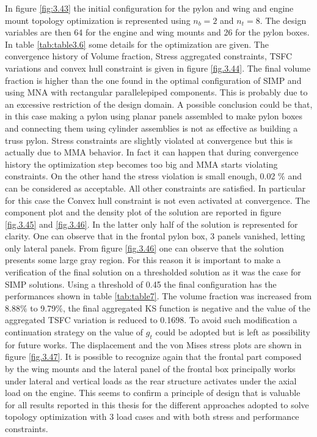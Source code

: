     In figure \ref{fig:3.43} the initial configuration for the pylon and wing and engine mount topology optimization is represented using $n_b=2$ and $n_t=8$. The design variables are then 64 for the engine and wing mounts and 26 for the pylon boxes. In table \ref{tab:table3.6} some details for the optimization are  given. The convergence history of Volume fraction, Stress aggregated constraints, TSFC variations and convex hull constraint is given in figure \ref{fig.3.44}. The final volume fraction is higher than the one found in the optimal configuration of SIMP and using MNA with rectangular parallelepiped components. This is probably due to an excessive restriction of the design domain. A possible conclusion could be that, in this case making a pylon using planar panels assembled to make pylon boxes and connecting them using cylinder assemblies is not as effective as building a truss pylon. Stress constraints are slightly violated at convergence but this is actually due to MMA behavior. In fact it can happen that during convergence history the optimization step becomes too big and MMA starts violating constraints. On the other hand the stress violation is small enough, 0.02 $\%$ and can be considered as acceptable. All other constraints are satisfied. In particular for this case the Convex hull constraint is not even activated at convergence. The component plot and the density plot of the solution are reported in figure \ref{fig.3.45} and \ref{fig.3.46}. In the latter only half of the solution is represented for clarity. One can observe that in the frontal pylon box, 3 panels vanished, letting only lateral panels. From figure \ref{fig.3.46} one can observe that the solution presents some large gray region. For this reason it is important to make a verification of the final solution on a thresholded solution as it was the case for SIMP solutions. Using a threshold of 0.45 the final configuration has the performances shown in table \ref{tab:table7}. The volume fraction was increased from 8.88$\%$ to 9.79$\%$, the final aggregated KS function is negative and the value of the aggregated TSFC variation is reduced to 0.1698. To avoid such modification a continuation strategy on the value of $g_t$ could be adopted but is left as possibility for future works. The displacement and the von Mises stress plots are shown in figure \ref{fig.3.47}. It is possible to recognize again that the frontal part composed by the wing mounts and the lateral panel of the frontal box principally works under lateral and vertical loads as the rear structure activates under the axial load on the engine. This seems to confirm a principle of design that is valuable for all results reported in this thesis for the different approaches adopted to solve topology optimization with 3 load cases and with both stress and performance constraints.
    

